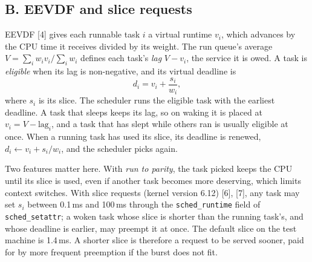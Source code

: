 \documentclass{article}
\begin{document}
\subsection*{B. EEVDF and slice requests}
EEVDF [4] gives each runnable task $i$ a virtual runtime $v_i$, which advances by the CPU time it receives divided by its weight. The run queue's average $V=\sum_i w_iv_i/\sum_i w_i$ defines each task's \emph{lag} $V-v_i$, the service it is owed. A task is \emph{eligible} when its lag is non-negative, and its virtual deadline is
\begin{equation}
d_i = v_i + \frac{s_i}{w_i},
\end{equation}
where $s_i$ is its slice. The scheduler runs the eligible task with the earliest deadline. A task that sleeps keeps its lag, so on waking it is placed at $v_i=V-\text{lag}_i$, and a task that has slept while others ran is usually eligible at once. When a running task has used its slice, its deadline is renewed, $d_i\leftarrow v_i+s_i/w_i$, and the scheduler picks again.

Two features matter here. With \emph{run to parity}, the task picked keeps the CPU until its slice is used, even if another task becomes more deserving, which limits context switches. With slice requests (kernel version 6.12) [6], [7], any task may set $s_i$ between 0.1\,ms and 100\,ms through the \texttt{sched\_runtime} field of \texttt{sched\_setattr}; a woken task whose slice is shorter than the running task's, and whose deadline is earlier, may preempt it at once. The default slice on the test machine is 1.4\,ms. A shorter slice is therefore a request to be served sooner, paid for by more frequent preemption if the burst does not fit.
\end{document}
